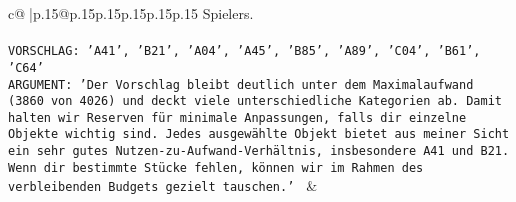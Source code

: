 \documentclass{article}
\begin{document}
{\begin{supertabular}{c@{$\;$}|p{.15\linewidth}@{}p{.15\linewidth}p{.15\linewidth}p{.15\linewidth}p{.15\linewidth}p{.15\linewidth}}
{{{Spielers.\\ \tt \\ \tt VORSCHLAG: {'A41', 'B21', 'A04', 'A45', 'B85', 'A89', 'C04', 'B61', 'C64'}\\ \tt ARGUMENT: {'Der Vorschlag bleibt deutlich unter dem Maximalaufwand (3860 von 4026) und deckt viele unterschiedliche Kategorien ab. Damit halten wir Reserven für minimale Anpassungen, falls dir einzelne Objekte wichtig sind. Jedes ausgewählte Objekt bietet aus meiner Sicht ein sehr gutes Nutzen-zu-Aufwand-Verhältnis, insbesondere A41 und B21. Wenn dir bestimmte Stücke fehlen, können wir im Rahmen des verbleibenden Budgets gezielt tauschen.'} 
	  } 
	   } 
	   } 
	 & \\ 
 

    \theutterance {}  


\end{supertabular}}
\end{document}
